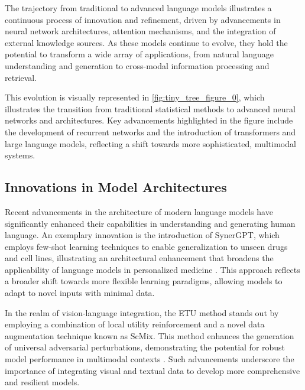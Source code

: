 The trajectory from traditional to advanced language models illustrates a continuous process of innovation and refinement, driven by advancements in neural network architectures, attention mechanisms, and the integration of external knowledge sources. As these models continue to evolve, they hold the potential to transform a wide array of applications, from natural language understanding and generation to cross-modal information processing and retrieval. 

This evolution is visually represented in \autoref{fig:tiny_tree_figure_0}, which illustrates the transition from traditional statistical methods to advanced neural networks and architectures. Key advancements highlighted in the figure include the development of recurrent networks and the introduction of transformers and large language models, reflecting a shift towards more sophisticated, multimodal systems.


\subsection{Innovations in Model Architectures} \label{subsec:Innovations in Model Architectures}

Recent advancements in the architecture of modern language models have significantly enhanced their capabilities in understanding and generating human language. An exemplary innovation is the introduction of SynerGPT, which employs few-shot learning techniques to enable generalization to unseen drugs and cell lines, illustrating an architectural enhancement that broadens the applicability of language models in personalized medicine \cite{edwards2023synergptincontextlearningpersonalized}. This approach reflects a broader shift towards more flexible learning paradigms, allowing models to adapt to novel inputs with minimal data.



In the realm of vision-language integration, the ETU method stands out by employing a combination of local utility reinforcement and a novel data augmentation technique known as ScMix. This method enhances the generation of universal adversarial perturbations, demonstrating the potential for robust model performance in multimodal contexts \cite{zhang2024universaladversarialperturbationsvisionlanguage}. Such advancements underscore the importance of integrating visual and textual data to develop more comprehensive and resilient models.




